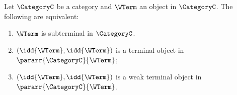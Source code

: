     \begingroup
    \def\theproposition{\ref{prop: subterminal as weak terminal parallel arrow}}
    \begin{proposition}
        Let $\CategoryC$ be a category and $\WTerm$ an object in $\CategoryC$.
        The following are equivalent:
        \begin{enumerate}[label=(\alph*)]
            \item $\WTerm$ is subterminal in $\CategoryC$.
            \item $(\idd{\WTerm}, \idd{\WTerm})$ is a terminal object in $\pararr{\CategoryC}{\WTerm}$;
            \item $(\idd{\WTerm}, \idd{\WTerm})$ is a weak terminal object in $\pararr{\CategoryC}{\WTerm}$.
        \end{enumerate}
    \end{proposition}
    \addtocounter{proposition}{-1}
    \endgroup
